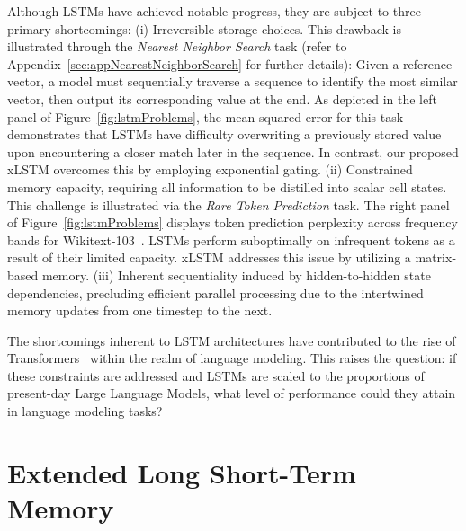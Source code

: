 Although LSTMs have achieved notable progress, they are subject to three primary shortcomings: (i) Irreversible storage choices. This drawback is illustrated through the {\it Nearest Neighbor Search} task (refer to Appendix~\ref{sec:appNearestNeighborSearch} for further details): Given a reference vector, a model must sequentially traverse a sequence to identify the most similar vector, then output its corresponding value at the end. As depicted in the left panel of Figure~\ref{fig:lstmProblems}, the mean squared error for this task demonstrates that LSTMs have difficulty overwriting a previously stored value upon encountering a closer match later in the sequence. In contrast, our proposed xLSTM overcomes this by employing exponential gating. (ii) Constrained memory capacity, requiring all information to be distilled into scalar cell states. This challenge is illustrated via the {\it Rare Token Prediction} task. The right panel of Figure~\ref{fig:lstmProblems} displays token prediction perplexity across frequency bands for Wikitext-103~\citep{Merity:17}. LSTMs perform suboptimally on infrequent tokens as a result of their limited capacity. xLSTM addresses this issue by utilizing a matrix-based memory. (iii) Inherent sequentiality induced by hidden-to-hidden state dependencies, precluding efficient parallel processing due to the intertwined memory updates from one timestep to the next.

The shortcomings inherent to LSTM architectures have contributed to the rise of Transformers~\citep{Vaswani:17} within the realm of language modeling. This raises the question: if these constraints are addressed and LSTMs are scaled to the proportions of present-day Large Language Models, what level of performance could they attain in language modeling tasks?

\section{Extended Long Short-Term Memory}
\label{sec:xLSTM}

